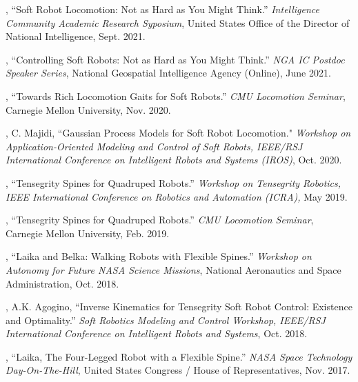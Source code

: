 \documentclass[letterpaper]{deedy-resume} %
\begin{document}
{\begin{etaremune}[itemsep=0.1cm]
\item \underline{{}}, ``Soft Robot Locomotion: Not as Hard as You Might Think.'' {\it Intelligence Community Academic Research Syposium}, United States Office of the Director of National Intelligence, Sept. 2021.

\item \underline{{}}, ``Controlling Soft Robots: Not as Hard as You Might Think.'' {\it NGA IC Postdoc Speaker Series}, National Geospatial Intelligence Agency (Online), June 2021.

\item \underline{{}}, ``Towards Rich Locomotion Gaits for Soft Robots.'' {\it CMU Locomotion Seminar}, Carnegie Mellon University, Nov. 2020.

\item \underline{{}}, C. Majidi, ``Gaussian Process Models for Soft Robot Locomotion." {\it Workshop on Application-Oriented Modeling and Control of Soft Robots, IEEE/RSJ International Conference on Intelligent Robots and Systems (IROS)}, Oct. 2020.

\item \underline{{}}, ``Tensegrity Spines for Quadruped Robots.'' {\it Workshop on Tensegrity Robotics, IEEE International Conference on Robotics and Automation (ICRA),} May 2019.

\item \underline{{}}, ``Tensegrity Spines for Quadruped Robots.'' {\it CMU Locomotion Seminar}, Carnegie Mellon University, Feb. 2019.

\item \underline{{}}, ``Laika and Belka: Walking Robots with Flexible Spines.'' {\it Workshop on Autonomy for Future NASA Science Missions}, National Aeronautics and Space Administration, Oct. 2018.

\item \underline{{}}, A.K. Agogino, ``Inverse Kinematics for Tensegrity Soft Robot Control: Existence and Optimality.'' {\it Soft Robotics Modeling and Control Workshop, IEEE/RSJ International Conference on Intelligent Robots and Systems}, Oct. 2018.

\item \underline{{}}, ``Laika, The Four-Legged Robot with a Flexible Spine.'' {\it NASA Space Technology Day-On-The-Hill}, United States Congress / House of Representatives, Nov. 2017.


\end{etaremune}}
\end{document}
